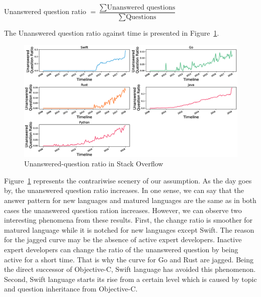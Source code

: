 Unanswered question ratio $ = \dfrac{\sum \text{Unanswered questions}}{\sum \text{Questions}}$

The Unanswered question ratio against time is presented in Figure~\ref{fig:Unanswered-question ratio}.
\begin{figure}[htbp]
\centering
\includegraphics[scale=0.38]{figures/UnansweredQuestionRatio.eps}
\caption{Unanswered-question ratio in Stack Overflow}
\label{fig:Unanswered-question ratio}
\end{figure}


Figure~\ref{fig:Unanswered-question ratio} represents the contrariwise scenery of our assumption. As the day goes by, the unanswered question ratio increases. In one sense, we can say that the answer pattern for new languages and matured languages are the same as in both cases the unanswered question ration increases. However, we can observe two interesting phenomena from these results. First, the change ratio is smoother for matured language while it is notched for new languages except Swift. The reason for the jagged curve may be the absence of active expert developers. Inactive expert developers can change the ratio of the unanswered question by being active for a short time. That is why the curve for Go and Rust are jagged. Being the direct successor of Objective-C, Swift language has avoided this phenomenon. Second, Swift language starts its rise from a certain level which is caused by topic and question inheritance from Objective-C.

